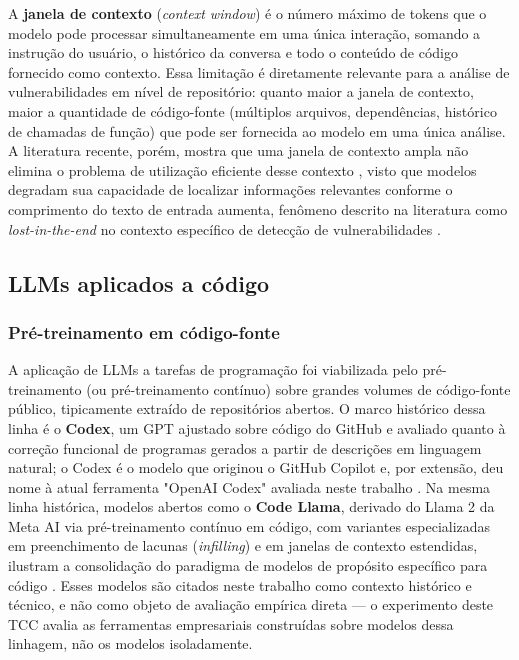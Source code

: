A \textbf{janela de contexto} (\textit{context window}) é o número máximo de tokens que o modelo pode processar simultaneamente em uma única interação, somando a instrução do usuário, o histórico da conversa e todo o conteúdo de código fornecido como contexto. Essa limitação é diretamente relevante para a análise de vulnerabilidades em nível de repositório: quanto maior a janela de contexto, maior a quantidade de código-fonte (múltiplos arquivos, dependências, histórico de chamadas de função) que pode ser fornecida ao modelo em uma única análise. A literatura recente, porém, mostra que uma janela de contexto ampla não elimina o problema de utilização eficiente desse contexto , visto que modelos degradam sua capacidade de localizar informações relevantes conforme o comprimento do texto de entrada aumenta, fenômeno descrito na literatura como \textit{lost-in-the-end} no contexto específico de detecção de vulnerabilidades \cite{Sovrano2025LostInEnd}.


\subsection{LLMs aplicados a código}\label{subsec:llms-codigo}
\subsubsection{Pré-treinamento em código-fonte}\label{subsubsec:pre-treinamento-codigo}
A aplicação de LLMs a tarefas de programação foi viabilizada pelo pré-treinamento (ou pré-treinamento contínuo) sobre grandes volumes de código-fonte público, tipicamente extraído de repositórios abertos. O marco histórico dessa linha é o \textbf{Codex}, um GPT ajustado sobre código do GitHub e avaliado quanto à correção funcional de programas gerados a partir de descrições em linguagem natural; o Codex é o modelo que originou o GitHub Copilot e, por extensão, deu nome à atual ferramenta "OpenAI Codex" avaliada neste trabalho \cite{Chen2021Codex}. Na mesma linha histórica, modelos abertos como o \textbf{Code Llama}, derivado do Llama 2 da Meta AI via pré-treinamento contínuo em código, com variantes especializadas em preenchimento de lacunas (\textit{infilling}) e em janelas de contexto estendidas, ilustram a consolidação do paradigma de modelos de propósito específico para código \cite{Roziere2023CodeLlama}. Esses modelos são citados neste trabalho como contexto histórico e técnico, e não como objeto de avaliação empírica direta — o experimento deste TCC avalia as ferramentas empresariais construídas sobre modelos dessa linhagem, não os modelos isoladamente.


